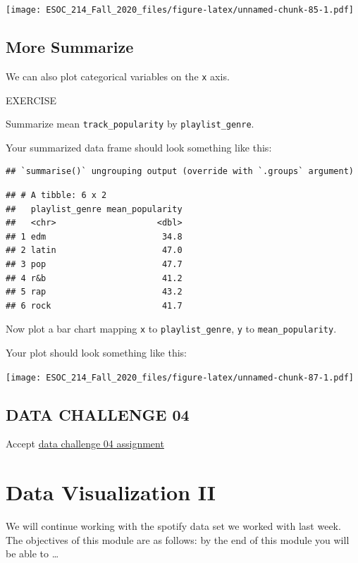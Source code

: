 \documentclass[
]{book}
\begin{document}
\texttt{[image: ESOC\_214\_Fall\_2020\_files/figure-latex/unnamed-chunk-85-1.pdf]}

\hypertarget{more-summarize}{%
\section{More Summarize}\label{more-summarize}}

We can also plot categorical variables on the \texttt{x} axis.

EXERCISE

Summarize mean \texttt{track\_popularity} by \texttt{playlist\_genre}.

Your summarized data frame should look something like this:

\begin{verbatim}
## `summarise()` ungrouping output (override with `.groups` argument)
\end{verbatim}

\begin{verbatim}
## # A tibble: 6 x 2
##   playlist_genre mean_popularity
##   <chr>                    <dbl>
## 1 edm                       34.8
## 2 latin                     47.0
## 3 pop                       47.7
## 4 r&b                       41.2
## 5 rap                       43.2
## 6 rock                      41.7
\end{verbatim}

Now plot a bar chart mapping \texttt{x} to \texttt{playlist\_genre}, \texttt{y} to \texttt{mean\_popularity}.

Your plot should look something like this:

\texttt{[image: ESOC\_214\_Fall\_2020\_files/figure-latex/unnamed-chunk-87-1.pdf]}

\hypertarget{data-challenge-04}{%
\section{DATA CHALLENGE 04}\label{data-challenge-04}}

Accept \href{}{data challenge 04 assignment}

\hypertarget{data-visualization-ii}{%
\chapter{Data Visualization II}\label{data-visualization-ii}}

We will continue working with the spotify data set we worked with last week. The objectives of this module are as follows: by the end of this module you will be able to \ldots{}
\end{document}
